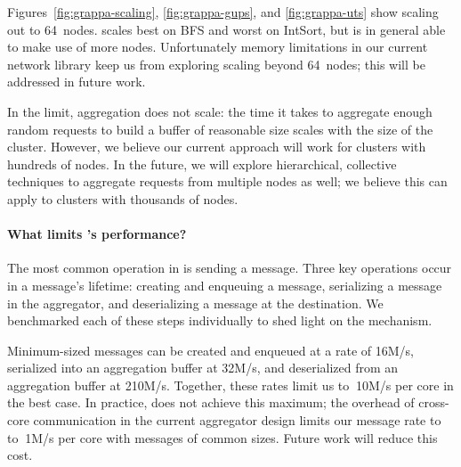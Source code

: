 Figures~\ref{fig:grappa-scaling}, \ref{fig:grappa-gups}, and
\ref{fig:grappa-uts} show scaling out to 64~nodes. \Grappa scales best
on BFS and worst on IntSort, but is in general able to make use of
more nodes. Unfortunately memory limitations in our current network
library keep us from exploring scaling beyond 64~nodes; this will be
addressed in future work.

In the limit, aggregation does not scale: the time it takes to
aggregate enough random requests to build a buffer of reasonable size
scales with the size of the cluster. However, we believe our current
approach will work for clusters with hundreds of nodes. In the future,
we will explore hierarchical, collective techniques to aggregate
requests from multiple nodes as well; we believe this can apply to
clusters with thousands of nodes.

\paragraph{What limits \Grappa's performance?}
The most common operation in \Grappa is sending a message. Three key
operations occur in a message's lifetime: creating and enqueuing a
message, serializing a message in the aggregator, and deserializing a
message at the destination. We benchmarked each of these steps
individually to shed light on the mechanism.

Minimum-sized messages can be created and enqueued at a rate of 16M/s,
serialized into an aggregation buffer at 32M/s, and deserialized from
an aggregation buffer at 210M/s.  Together, these rates limit us to
$~$10M/s per core in the best case. In practice, \Grappa does not
achieve this maximum; the overhead of cross-core communication in the
current aggregator design limits our message rate to to $~$1M/s per
core with messages of common sizes. Future work will reduce this cost.







